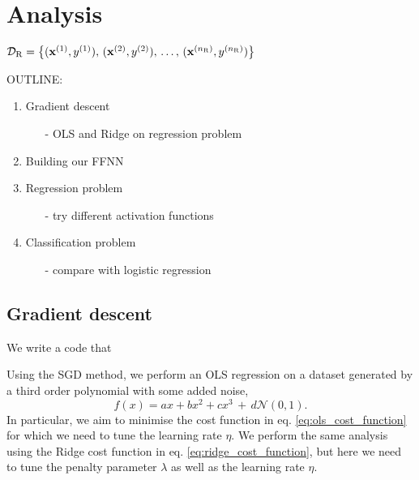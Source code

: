 \section{Analysis}\label{sec:analysis}


$\mathcal{D}_\mathrm{R} = \big\{ (\mathbf{x}^{(1)}, y^{(1)}), \,  (\mathbf{x}^{(2)}, y^{(2)}), \,\dots, \, (\mathbf{x}^{({n_\mathrm{R}})}, y^{(n_\mathrm{R})}) \big\}$ 



OUTLINE:
\begin{enumerate}
    \item Gradient descent \begin{enumerate}
        \item[-] OLS and Ridge on regression problem
    \end{enumerate}
    \item Building our FFNN
    \item Regression problem \begin{enumerate}
        \item[-] try different activation functions
    \end{enumerate}
    \item Classification problem \begin{enumerate}
        \item[-] compare with logistic regression 
    \end{enumerate}
\end{enumerate}

\subsection{Gradient descent}

    We write a code that  \fillertext


    Using the SGD method, we perform an OLS regression on a dataset generated by a third order polynomial with some added noise,
    \begin{equation}
        f(x) = ax + bx^2 + cx^3 \, +\, d\mathcal{N}(0, 1). %
    \end{equation}
    In particular, we aim to minimise the cost function in eq. \eqref{eq:ols_cost_function} for which we need to tune the learning rate $\eta$. We perform the same analysis using the Ridge cost function in eq. \eqref{eq:ridge_cost_function}, but here we need to tune the penalty parameter $\lambda$ as well as the learning rate $\eta$. 

